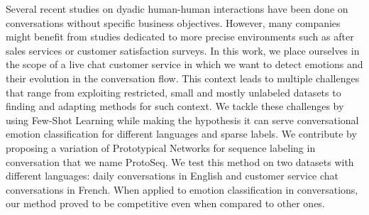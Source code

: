 Several recent studies on dyadic human-human interactions have been done on conversations without specific business objectives. However, many companies might benefit from studies dedicated to more precise environments such as after sales services or customer satisfaction surveys. In this work, we place ourselves in the scope of a live chat customer service in which we want to detect emotions and their evolution in the conversation flow. This context leads to multiple challenges that range from exploiting restricted, small and mostly unlabeled datasets to finding and adapting methods for such context. We tackle these challenges by using Few-Shot Learning while making the hypothesis it can serve conversational emotion classification for different languages and sparse labels. We contribute by proposing a variation of Prototypical Networks for sequence labeling in conversation that we name ProtoSeq. We test this method on two datasets with different languages: daily conversations in English and customer service chat conversations in French. When applied to emotion classification in conversations, our method proved to be competitive even when compared to other ones.
